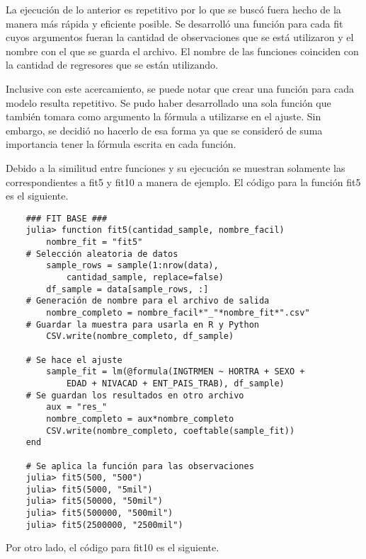 La ejecución de lo anterior es repetitivo por lo que se buscó fuera hecho de la manera más rápida y eficiente posible. Se desarrolló una función para cada \textsf{fit} cuyos argumentos fueran la cantidad de observaciones que se está utilizaron y el nombre con el que se guarda el archivo. El nombre de las funciones coinciden con la cantidad de regresores que se están utilizando. 

Inclusive con este acercamiento, se puede notar que crear una función para cada modelo resulta repetitivo. Se pudo haber desarrollado una sola función que también tomara como argumento la fórmula a utilizarse en el ajuste. Sin embargo, se decidió no hacerlo de esa forma ya que se consideró de suma importancia tener la fórmula escrita en cada función. 

Debido a la similitud entre funciones y su ejecución se muestran solamente las correspondientes a \textsf{fit5} y \textsf{fit10} a manera de ejemplo. El código para la función \textsf{fit5} es el siguiente.

\begin{verbatim}
	### FIT BASE ###
	julia> function fit5(cantidad_sample, nombre_facil)
    	nombre_fit = "fit5"
    # Selección aleatoria de datos
    	sample_rows = sample(1:nrow(data), 
    		cantidad_sample, replace=false)
    	df_sample = data[sample_rows, :]
    # Generación de nombre para el archivo de salida
    	nombre_completo = nombre_facil*"_"*nombre_fit*".csv"
    # Guardar la muestra para usarla en R y Python
    	CSV.write(nombre_completo, df_sample)

    # Se hace el ajuste
    	sample_fit = lm(@formula(INGTRMEN ~ HORTRA + SEXO + 
    		EDAD + NIVACAD + ENT_PAIS_TRAB), df_sample)
	# Se guardan los resultados en otro archivo
    	aux = "res_"
    	nombre_completo = aux*nombre_completo
    	CSV.write(nombre_completo, coeftable(sample_fit))
	end 

	# Se aplica la función para las observaciones
	julia> fit5(500, "500")
	julia> fit5(5000, "5mil")
	julia> fit5(50000, "50mil")
	julia> fit5(500000, "500mil")
	julia> fit5(2500000, "2500mil")

\end{verbatim}

Por otro lado, el código para \textsf{fit10} es el siguiente. 

